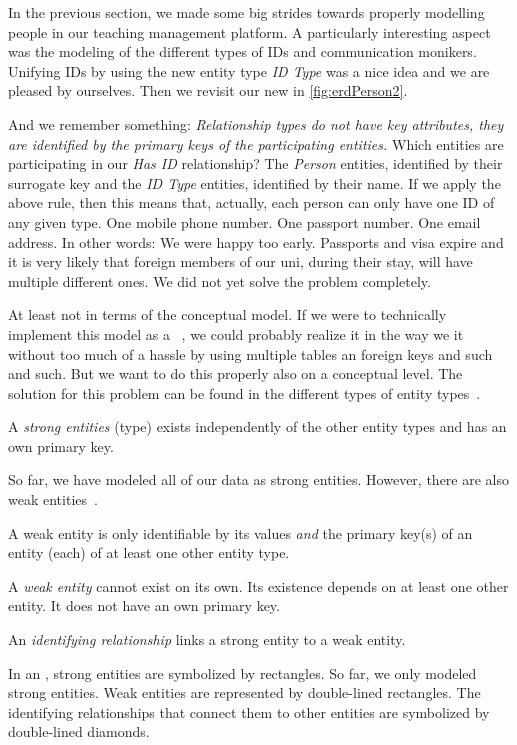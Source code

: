 %
%
%
In the previous section, we made some big strides towards properly modelling people in our teaching management platform.
A particularly interesting aspect was the modeling of the different types of IDs and communication monikers.
Unifying IDs by using the new entity type \emph{ID Type} was a nice idea and we are pleased by ourselves.
Then we revisit our new  in \cref{fig:erdPerson2}.

And we remember something:
\emph{Relationship types do not have key attributes, they are identified by the primary keys of the participating entities.}
Which entities are participating in our \emph{Has ID} relationship?
The \emph{Person} entities, identified by their surrogate key and the \emph{ID Type} entities, identified by their name.
If we apply the above rule, then this means that, actually, each person can only have one ID of any given type.
One mobile phone number.
One passport number.
One email address.
In other words:
We were happy too early.
Passports and visa expire and it is very likely that foreign members of our uni, during their stay, will have multiple different ones.
We did not yet solve the problem completely.

At least not in terms of the conceptual model.
If we were to technically implement this model as a \postgresql\ \db, we could probably realize it in the way we  it without too much of a hassle by using multiple tables an foreign keys and such and such.
But we want to do this properly also on a conceptual level.
The solution for this problem can be found in the different types of entity types~\cite{S2024D:CDMERDE}.%
%
\begin{definition}%
A \emph{strong entities} (type) exists independently of the other entity types and has an own primary key.%
\end{definition}%
%
So far, we have modeled all of our data as strong entities.
However, there are also weak entities~\cite{P2006CITRD:CERDTRM,SS2005EIDDDFDB:CDDICAMP,S2024D:CDMERDE}.%
%
\begin{definition}%
A weak entity is only identifiable by its values \emph{and} the primary key(s) of an entity (each) of at least one other entity type.%
\end{definition}%
%
A \emph{weak entity} cannot exist on its own.
Its existence depends on at least one other entity.
It does not have an own primary key.
%
\begin{definition}%
An \emph{identifying relationship} links a strong entity to a weak entity.%
\end{definition}%
%
In an , strong entities are symbolized by rectangles.
So far, we only modeled strong entities.
Weak entities are represented by double-lined rectangles.
The identifying relationships that connect them to other entities are symbolized by double-lined diamonds.

